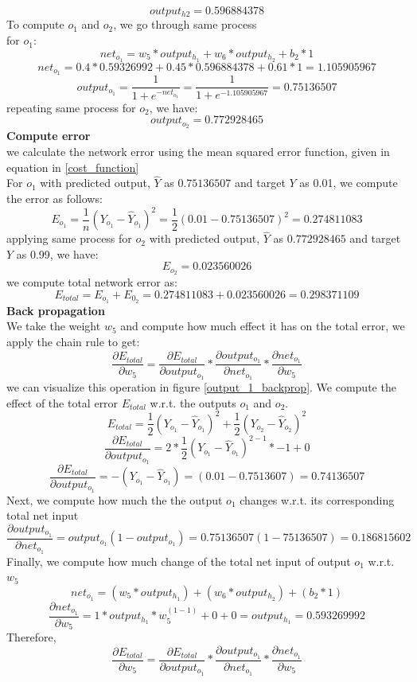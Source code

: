 \documentclass[master]{thesis-uestc}
\begin{document}
\[output_{h2} = 0.596884378\]
To compute $o_1$ and $o_2$, we go through same process\\
for $o_1$:
\[net_{o_1} = w_5 * output_{h_1} + w_6 * output_{h_2} + b_2 * 1\]
\[net_{o_1} = 0.4 * 0.59326992 + 0.45 * 0.596884378 + 0.61 * 1 = 1.105905967\]
\[output_{o_1} = \frac{1}{1 + e^{-net_{o_1}}} = \frac{1}{1 + e^{-1.105905967}} = 0.75136507\]
repeating same process for $o_2$, we have:
\[output_{o_2} = 0.772928465 \]
\textbf{Compute error} \\
we calculate the network error using the mean squared error function, given in equation in \ref{cost_function}\\
For $o_1$ with predicted output, $\hat{Y}$ as $0.75136507$ and target $Y$ as 0.01, we compute the error as follows:
\[E_{o_1} = \frac{1}{n}(Y_{o_1} - \hat{Y}_{o_1})^2 = \frac{1}{2}(0.01 - 0.75136507)^2 = 0.274811083\]
applying same process for $o_2$ with predicted output, $\hat{Y}$ as $0.772928465$ and target $Y$ as 0.99, we have:
\[E_{o_2} = 0.023560026\]
we compute total network error as:
\[E_{total} = E_{o_1} + E_{0_2} = 0.274811083 + 0.023560026 = 0.298371109\]
\textbf{Back propagation} \\
We take the weight $w_5$ and compute how much effect it has on the total error, we apply the chain rule to get:
\[\frac{\partial E_{total}}{\partial w_5} = \frac{\partial E_{total}}{\partial output_{o_1}} * \frac{\partial output_{o_1}}{\partial net_{o_1}} * \frac{\partial net_{o_1}}{\partial w_5}\]
we can visualize this operation in figure \ref{output_1_backprop}. We compute the effect of the total error $E_{total}$ w.r.t. the outputs $o_1$ and $o_2$.
\[ E_{total} = \frac{1}{2}(Y_{o_1} - \hat{Y}_{o_1})^2 + \frac{1}{2}(Y_{o_2} - \hat{Y}_{o_2})^2 \]
\[ \frac{\partial E_{total}}{\partial output_{o_1}} = 2 * \frac{1}{2}(Y_{o_1} - \hat{Y}_{o_1})^{2-1} * -1 + 0 \]
\[ \frac{\partial E_{total}}{\partial output_{o_1}} = -(Y_{o_1} - \hat{Y}_{o_1}) = (0.01 - 0.7513607) = 0.74136507 \]
Next, we compute how much the the output $o_1$ changes w.r.t. its corresponding total net input
\[ \frac{\partial output_{o_1}}{\partial net_{o_1}} = output_{o_1}(1 - output_{o_1}) = 0.75136507(1 - 75136507) = 0.186815602 \]
Finally, we compute how much change of the total net input of output $o_1$ w.r.t. $w_5$
\[ net_{o_1} = (w_5 * output_{h_1}) + (w_6 * output_{h_2}) + (b_2 * 1) \]
\[ \frac{\partial net_{o_1}}{\partial w_5} = 1 * output_{h_1} * w^{(1-1)}_{5} + 0 + 0 = output_{h_1} = 0.593269992 \]
Therefore, 
\[ \frac{\partial E_{total}}{\partial w_5} = \frac{\partial E_{total}}{\partial output_{o_1}} * \frac{\partial output_{o_1}}{\partial net_{o_1}} * \frac{\partial net_{o_1}}{\partial w_5}\]
\end{document}
